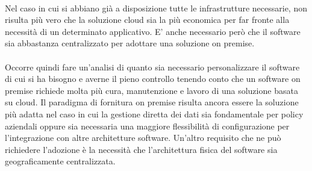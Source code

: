 \paragraph{}
Nel caso in cui si abbiano già a disposizione tutte le infrastrutture necessarie, non risulta più vero che la soluzione cloud sia la più economica per far fronte alla necessità di un determinato applicativo. E' anche necessario però che il software sia abbastanza centralizzato per adottare una soluzione on premise.

\paragraph{}
Occorre quindi fare un'analisi di quanto sia necessario personalizzare il software di cui si ha bisogno e averne il pieno controllo tenendo conto che un software on premise richiede molta più cura, manutenzione e lavoro di una soluzione basata su cloud. Il paradigma di fornitura on premise risulta ancora essere la soluzione più adatta nel caso in cui la gestione diretta dei dati sia fondamentale per policy aziendali oppure sia necessaria una maggiore flessibilità di configurazione per l’integrazione con altre architetture software. Un'altro requisito che ne può richiedere l'adozione è la necessità che l'architettura fisica del software sia geograficamente centralizzata.
